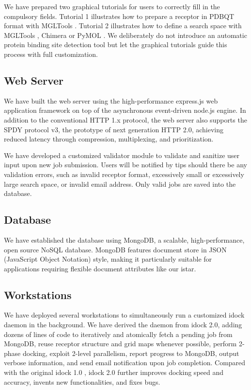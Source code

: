 \documentclass[12pt]{article}
\begin{document}
We have prepared two graphical tutorials for users to correctly fill in the compulsory fields. Tutorial 1 illustrates how to prepare a receptor in PDBQT format with MGLTools \citep{596}. Tutorial 2 illustrates how to define a search space with MGLTools \citep{596}, Chimera \citep{1219} or PyMOL \citep{1221}. We deliberately do not introduce an automatic protein binding site detection tool but let the graphical tutorials guide this process with full customization.

\subsection*{\sffamily \large Web Server}

We have built the web server using the high-performance express.js web application framework on top of the asynchronous event-driven node.js engine. In addition to the conventional HTTP 1.x protocol, the web server also supports the SPDY protocol v3, the prototype of next generation HTTP 2.0, achieving reduced latency through compression, multiplexing, and prioritization.

We have developed a customized validator module to validate and sanitize user input upon new job submission. Users will be notified by tips should there be any validation errors, such as invalid receptor format, excessively small or excessively large search space, or invalid email address. Only valid jobs are saved into the database.

\subsection*{\sffamily \large Database}

We have established the database using MongoDB, a scalable, high-performance, open source NoSQL database. MongoDB features document store in JSON (JavaScript Object Notation) style, making it particularly suitable for applications requiring flexible document attributes like our istar. 

\subsection*{\sffamily \large Workstations}

We have deployed several workstations to simultaneously run a customized idock daemon in the background. We have derived the daemon from idock 2.0, adding dozens of lines of code to iteratively and atomically fetch a pending job from MongoDB, reuse receptor structure and grid maps whenever possible, perform 2-phase docking, exploit 2-level parallelism, report progress to MongoDB, output verbose information, and send email notification upon job completion. Compared with the original idock 1.0 \citep{1153}, idock 2.0 further improves docking speed and accuracy, invents new functionalities, and fixes bugs.
\end{document}
